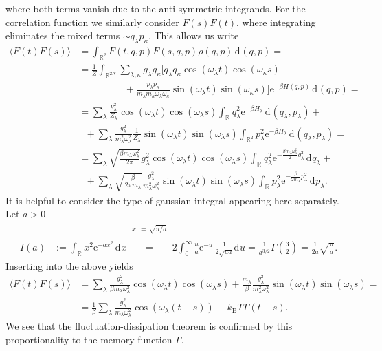 \documentclass[english, parskip=full]{scrartcl}
\newcommand{\bra}{}
\newcommand{\kom}{}
\newcommand{\intr}{}
\newcommand{\kla}{}
\newcommand{\tecxt}{}
\newcommand{\e}{\text{e}}
\begin{document}
where both terms vanish due to the anti-symmetric integrands.
For the correlation function we similarly consider $F(s)F(t)$, where integrating eliminates the mixed terms $\sim q_\lambda p_\kappa$.
This allows us write
\begin{align}
\bra\langle F(t)F(s) \rangle&=\intr\int_{\mathbb{R}^{2}} F(t,q,p)F(s,q,p)\rho(q,p) \, \mathrm{d}^{ }(q,p)=\\
&=\frac{1}{Z}\intr\int_{\mathbb{R}^{2N}} \sum_{\lambda,\kappa} g_\lambda g_\kappa \Big[q_\lambda q_\kappa\cos(\omega_\lambda t)\cos(\omega_\kappa s)+\\
&\hspace{2cm} + \frac{p_\lambda p_\kappa}{m_\lambda m_\kappa\omega_\lambda\omega_\kappa}\sin(\omega_\lambda t)\sin(\omega_\kappa s)\Big]\e^{-\beta H(q,p)} \, \mathrm{d}^{ }(q,p)=\\
&=\sum_\lambda\frac{g_\lambda^2}{Z_\lambda}\cos(\omega_\lambda t)\cos(\omega_\lambda s) \intr\int_{\mathbb{R}^{ }} q_\lambda^2\e^{-\beta H_\lambda} \, \mathrm{d}^{ }(q_\lambda,p_\lambda) + \\
&\ \ \ + \sum_\lambda\frac{g_\lambda^2}{m_\lambda^2\omega_\lambda^2}\frac{1}{Z_\lambda} \sin(\omega_\lambda t) \sin(\omega_\lambda s)  \intr\int_{\mathbb{R}^{2}} p_\lambda^2\e^{-\beta H_\lambda} \, \mathrm{d}^{ }(q_\lambda,p_\lambda)=\\
&=\sum_\lambda \sqrt{\frac{\beta m_\lambda\omega_\lambda^2}{2\pi }} g_\lambda^2 \cos(\omega_\lambda t)\cos(\omega_\lambda s) \intr\int_{\mathbb{R}^{ }} q_\lambda^2\e^{-\frac{\beta m_\lambda\omega_\lambda^2}{2}q_\lambda^2} \, \mathrm{d}^{ }q_\lambda + \\
&\ \ \ +\sum_\lambda\sqrt{\frac{\beta}{2\pi m_\lambda}}\frac{g_\lambda^2}{m_\lambda^2\omega_\lambda^2}\sin(\omega_\lambda t) \sin(\omega_\lambda s) \intr\int_{\mathbb{R}^{ }} p_\lambda^2\e^{-\frac{\beta}{2m_\lambda}p_\lambda^2} \, \mathrm{d}^{ }p_\lambda.
\end{align}
It is helpful to consider the type of gaussian integral appearing here separately.
Let $a>0$
\begin{align}
I(a)&:=\intr\int_{\mathbb{R}^{ }} x^2\e^{-ax^2} \, \mathrm{d}^{ }x\kom\overset{\substack{{x\,:=\,\sqrt{u / a}} \\ |}}{=}2\intr\int_{0}^\infty \frac{u}{a}\e^{-u} \, \frac{1}{2\sqrt{ua}}\mathrm{d}^{ }u=\frac{1}{a^{3/2}}\Gamma\kla\left( \frac{3}{2} \right)=\frac{1}{2a}\sqrt{\frac{\pi}{a}}.
\end{align}
Inserting into the above yields
\begin{align}
\bra\langle F(t)F(s) \rangle&=\sum_\lambda \frac{g_\lambda^2}{\beta m_\lambda\omega_\lambda^2}\cos(\omega_\lambda t) \cos(\omega_\lambda s) + \frac{m_\lambda}{\beta}\frac{g_\lambda^2}{m_\lambda^2\omega_\lambda^2} \sin(\omega_\lambda t) \sin(\omega_\lambda s)=\\
&=\frac{1}{\beta}\sum_\lambda\frac{g_\lambda^2}{m_\lambda\omega_\lambda^2}\cos\kla\left( \omega_\lambda (t-s) \right)\equiv k_\tecxt\text{B}T\Gamma(t-s).
\end{align}
We see that the fluctuation-dissipation theorem is confirmed by this proportionality to the memory function $\Gamma$.
\end{document}
